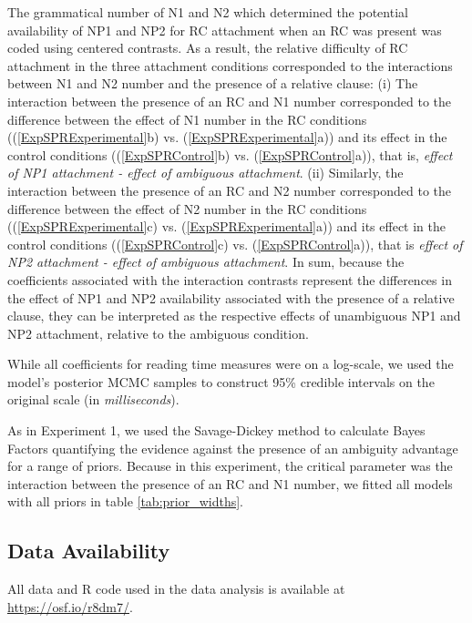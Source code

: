 \documentclass[english, doc]{apa7}\usepackage[]{graphicx}\usepackage[]{color}
\begin{document}
The grammatical number of N1 and N2 which determined the potential availability of NP1 and NP2 for RC attachment when an RC was present was coded using centered contrasts. As a result, the relative difficulty of RC attachment in the three attachment conditions corresponded to the interactions between N1 and N2 number and the presence of a relative clause: (i) The interaction between the presence of an RC and N1 number corresponded to the difference between the effect of N1 number in the RC conditions ((\ref{ExpSPRExperimental}b) vs. (\ref{ExpSPRExperimental}a)) and its effect in the control conditions ((\ref{ExpSPRControl}b) vs. (\ref{ExpSPRControl}a)), that is, \emph{effect of NP1 attachment - effect of ambiguous attachment}.
(ii) Similarly, the interaction between the presence of an RC and N2 number corresponded to the difference between the effect of N2 number in the RC conditions ((\ref{ExpSPRExperimental}c) vs. (\ref{ExpSPRExperimental}a)) and its effect in the control conditions ((\ref{ExpSPRControl}c) vs. (\ref{ExpSPRControl}a)), that is \emph{effect of NP2 attachment - effect of ambiguous attachment}.
In sum, because the coefficients associated with the interaction contrasts represent the differences in the effect of NP1 and NP2 availability associated with the presence of a relative clause, they can be interpreted as the respective effects of unambiguous NP1 and NP2 attachment, relative to the ambiguous condition.

While all coefficients for reading time measures were on a log-scale, we used the model's posterior MCMC samples to construct 95\% credible intervals on the original scale (in \emph{milliseconds}).

As in Experiment 1, we used the Savage-Dickey method to calculate Bayes Factors quantifying the evidence against the presence of an ambiguity advantage for a range of priors. Because in this experiment, the critical parameter was the interaction between the presence of an RC and N1 number, we fitted all models with all priors in table \ref{tab:prior_widths}.

\subsection{Data Availability}
All data and R code used in the data analysis is available at \url{https://osf.io/r8dm7/}.
\end{document}
